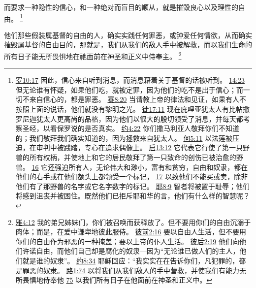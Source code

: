 \documentclass[12pt, a4paper, oneside]{ctexart}
\newcounter{parnum}[section]
\newcommand{\N}{%
   \noindent\refstepcounter{parnum}%
    \makebox[\parindent][l]{\textbf{\arabic{parnum}.}}}
\begin{document}
	而要求一种隐性的信心，和一种绝对而盲目的顺从，就是摧毁良心以及理性的自由。
	\footnote {
		\href{https://biblehub.com/romans/10-17.htm}{罗10:17} 因此，信心来自听到消息，而消息藉着关于基督的话被听到。
		\href{https://biblehub.com/romans/14-23.htm}{14:23} 但无论谁有怀疑，如果他们吃，就被定罪，因为他们的吃不是出于信心；而一切不来自信心的，都是罪恶。
		\href{https://biblehub.com/isaiah/8-20.htm}{赛8:20} 当请教上帝的律法和见证，如果有人不按照上面的说话，他们就没有黎明之光。
		\href{https://biblehub.com/acts/17-11.htm}{徒17:11} 现在庇哩亚犹太人有比帖撒罗尼迦犹太人更高尚的品格，因为他们以很大的殷切领受了消息，并每天都考察圣经，以看保罗说的是否真实。
		\href{https://biblehub.com/john/4-22.htm}{约4:22} 你们撒马利亚人敬拜你们不知道的；我们敬拜我们确实知道的，因为拯救来自犹太人。
		\href{https://biblehub.com/hosea/5-11.htm}{何5:11} 以法莲被压迫，在审判中被践踏，专心在追求偶像上。
		\href{https://biblehub.com/revelation/13-12.htm}{启13:12} 它代表它行使了第一只野兽的所有权柄，并使地上和它的居民敬拜了第一只致命的创伤已被治愈的野兽。
		\href{https://biblehub.com/revelation/13-16.htm}{16} 它还强迫所有人，无论伟大和渺小，富有和贫穷，自由和奴隶，都在他们的右手或在他们额头上都领受一个标记，
		\href{https://biblehub.com/revelation/13-17.htm}{17} 以致他们不能买或卖，除非他们有了那野兽的名字或它名字数字的标记。
		\href{https://biblehub.com/jeremiah/8-9.htm}{耶8:9} 智者将被置于耻辱；他们将感到沮丧并被困住。既然他们已拒斥耶和华的言，他们有什么样的智慧呢？
	}

\N 他们那些假装属基督的自由的人，确实实践任何罪恶，或钟爱任何情欲，从而确实摧毁属基督的自由目的，那就是，我们从我们的敌人手中被解救，而以我们生命的所有日子能无所畏惧地在祂面前在神圣和正义中侍奉主。
	\footnote {
		\href{https://biblehub.com/galatians/5-13.htm}{雅4:12} 我的弟兄姊妹们，你们被召唤而获释放了。但不要用你们的自由沉溺于肉体；而是，在爱中谦卑地彼此服侍。
		\href{https://biblehub.com/1_peter/2-16.htm}{彼前2:16} 要以自由人生活，但不要用你们的自由作为邪恶的一种掩盖；要以上帝的仆人生活。
		\href{https://biblehub.com/2_peter/2-19.htm}{彼后2:19} 他们向他们许诺自由，而他们自己却是腐化的奴隶---因为“无论谁已做人们的主人，他们就是谁的奴隶”。
		\href{https://biblehub.com/john/8-34.htm}{约8:34} 耶稣回应：“我实实在在告诉你们，凡犯罪的，都是罪恶的奴隶。
		\href{https://biblehub.com/luke/1-74.htm}{路1:74} 以将我们从我们敌人的手中营救，并使我们有能力无所畏惧地侍奉他
		\href{https://biblehub.com/luke/1-75.htm}{75} 以我们所有日子在他面前在神圣和正义中。
	}
\end{document}
